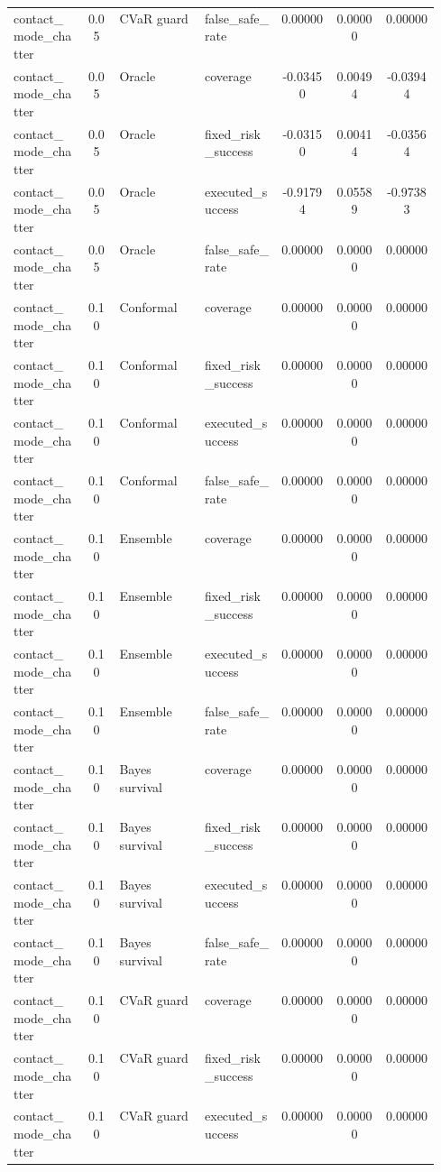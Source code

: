 \documentclass{article}
\begin{document}
\begin{center}
\begin{longtable}{p{0.17\linewidth}cp{0.20\linewidth}p{0.18\linewidth}ccc}
contact\_mode\_chatter & 0.05 & CVaR guard & false\_safe\_rate & 0.00000 & 0.00000 & 0.00000\\
contact\_mode\_chatter & 0.05 & Oracle & coverage & -0.03450 & 0.00494 & -0.03944\\
contact\_mode\_chatter & 0.05 & Oracle & fixed\_risk\_success & -0.03150 & 0.00414 & -0.03564\\
contact\_mode\_chatter & 0.05 & Oracle & executed\_success & -0.91794 & 0.05589 & -0.97383\\
contact\_mode\_chatter & 0.05 & Oracle & false\_safe\_rate & 0.00000 & 0.00000 & 0.00000\\
contact\_mode\_chatter & 0.10 & Conformal & coverage & 0.00000 & 0.00000 & 0.00000\\
contact\_mode\_chatter & 0.10 & Conformal & fixed\_risk\_success & 0.00000 & 0.00000 & 0.00000\\
contact\_mode\_chatter & 0.10 & Conformal & executed\_success & 0.00000 & 0.00000 & 0.00000\\
contact\_mode\_chatter & 0.10 & Conformal & false\_safe\_rate & 0.00000 & 0.00000 & 0.00000\\
contact\_mode\_chatter & 0.10 & Ensemble & coverage & 0.00000 & 0.00000 & 0.00000\\
contact\_mode\_chatter & 0.10 & Ensemble & fixed\_risk\_success & 0.00000 & 0.00000 & 0.00000\\
contact\_mode\_chatter & 0.10 & Ensemble & executed\_success & 0.00000 & 0.00000 & 0.00000\\
contact\_mode\_chatter & 0.10 & Ensemble & false\_safe\_rate & 0.00000 & 0.00000 & 0.00000\\
contact\_mode\_chatter & 0.10 & Bayes survival & coverage & 0.00000 & 0.00000 & 0.00000\\
contact\_mode\_chatter & 0.10 & Bayes survival & fixed\_risk\_success & 0.00000 & 0.00000 & 0.00000\\
contact\_mode\_chatter & 0.10 & Bayes survival & executed\_success & 0.00000 & 0.00000 & 0.00000\\
contact\_mode\_chatter & 0.10 & Bayes survival & false\_safe\_rate & 0.00000 & 0.00000 & 0.00000\\
contact\_mode\_chatter & 0.10 & CVaR guard & coverage & 0.00000 & 0.00000 & 0.00000\\
contact\_mode\_chatter & 0.10 & CVaR guard & fixed\_risk\_success & 0.00000 & 0.00000 & 0.00000\\
contact\_mode\_chatter & 0.10 & CVaR guard & executed\_success & 0.00000 & 0.00000 & 0.00000\\

\end{longtable}
\end{center}
\end{document}
